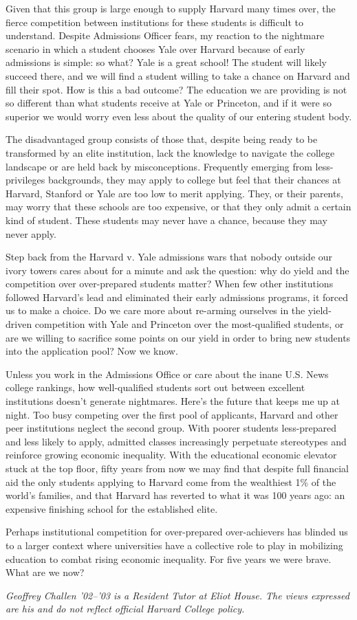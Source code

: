 Given that this group is large enough to supply Harvard many times over, the
fierce competition between institutions for these students is difficult to
understand. Despite Admissions Officer fears, my reaction to the nightmare
scenario in which a student chooses Yale over Harvard because of early
admissions is simple: so what? Yale is a great school! The student will
likely succeed there, and we will find a student willing to take a chance on
Harvard and fill their spot. How is this a bad outcome? The education we are
providing is not so different than what students receive at Yale or
Princeton, and if it were so superior we would worry even less about the
quality of our entering student body.

The disadvantaged group consists of those that, despite being ready to be
transformed by an elite institution, lack the knowledge to navigate the
college landscape or are held back by misconceptions. Frequently emerging
from less-privileges backgrounds, they may apply to college but feel that
their chances at Harvard, Stanford or Yale are too low to merit applying.
They, or their parents, may worry that these schools are too expensive, or
that they only admit a certain kind of student. These students may never have
a chance, because they may never apply.

Step back from the Harvard v. Yale admissions wars that nobody outside our
ivory towers cares about for a minute and ask the question: why do yield and
the competition over over-prepared students matter? When few other
institutions followed Harvard's lead and eliminated their early admissions
programs, it forced us to make a choice. Do we care more about re-arming
ourselves in the yield-driven competition with Yale and Princeton over the
most-qualified students, or are we willing to sacrifice some points on our
yield in order to bring new students into the application pool? Now we know.

Unless you work in the Admissions Office or care about the inane U.S. News
college rankings, how well-qualified students sort out between excellent
institutions doesn't generate nightmares. Here's the future that keeps me up
at night. Too busy competing over the first pool of applicants, Harvard and
other peer institutions neglect the second group. With poorer students
less-prepared and less likely to apply, admitted classes increasingly
perpetuate stereotypes and reinforce growing economic inequality. With the
educational economic elevator stuck at the top floor, fifty years from now we
may find that despite full financial aid the only students applying to
Harvard come from the wealthiest 1\% of the world's families, and that
Harvard has reverted to what it was 100 years ago: an expensive finishing
school for the established elite.

Perhaps institutional competition for over-prepared over-achievers has
blinded us to a larger context where universities have a collective role to
play in mobilizing education to combat rising economic inequality. For five
years we were brave. What are we now?


\textit{Geoffrey Challen '02--'03 is a Resident Tutor at Eliot House. The
views expressed are his and do not reflect official Harvard College policy.}
